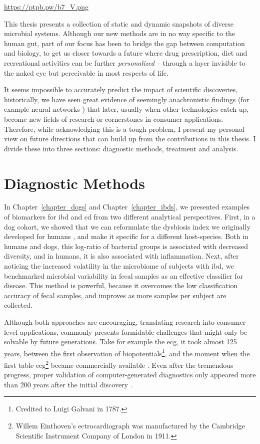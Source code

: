 \url{https://ptpb.pw/b7_V.png}

This thesis presents a collection of static and dynamic snapshots of diverse
microbial systems. Although our new methods are in no way specific to the human
gut, part of our focus has been to bridge the gap between computation and
biology, to get us closer towards a future where drug prescription, diet and
recreational activities can be further \textit{personalized} -- through a layer
invisible to the naked eye but perceivable in most respects of life.

It seems impossible to accurately predict the impact of scientific discoveries, 
historically, we have seen great evidence of seemingly anachronistic findings 
(for example neural networks \cite{Tem10}) that later, usually when other 
technologies catch up, become new fields of research or cornerstones in 
consumer applications.  Therefore, while acknowledging this is a tough problem, 
I present my personal view on future directions that can build up from the 
contributions in this thesis. I divide these into three sections: diagnostic 
methods, treatment and analysis.

\section{Diagnostic Methods}

In Chapter~\ref{chapter_dogs} and Chapter~\ref{chapter_ibds}, we presented
examples of biomarkers for \gls{ibd} and \gls{cd} from two different analytical 
perspectives.  First, in a dog cohort, we showed that we can reformulate the 
dysbiosis index we originally developed for humans \cite{Gevers2014}, and make 
it specific for a different host\hyp{}species. Both in humans and dogs, this 
log-ratio of bacterial groups is associated with decreased diversity, and in 
humans, it is also associated with inflammation. Next, after noticing the 
increased volatility in the microbiome of subjects with \gls{ibd}, we 
benchmarked microbial variability in fecal samples as an effective classifier 
for disease.  This method is powerful, because it overcomes the low 
classification accuracy of fecal samples, and improves as more samples per 
subject are collected.

Although both approaches are encouraging, translating research into 
consumer\hyp{}level applications, commonly presents formidable challenges that 
might only be solvable by future generations.  Take for example the \gls{ecg}, 
it took almost 125 years, between the first observation of 
biopotentials\footnote{Credited to Luigi Galvani in 1787.}, and the moment when 
the first table \gls{ecg}\footnote{Willem Einthoven's ectrocardiograph was 
manufactured by the Cambridge Scientific Instrument Company of London in 1911.} 
became commercially available \cite{ECGZywietz}. Even after the tremendous 
progress, proper validation of computer-generated diagnostics only appeared 
more than 200 years after the initial discovery \cite{njem_ecg}.


